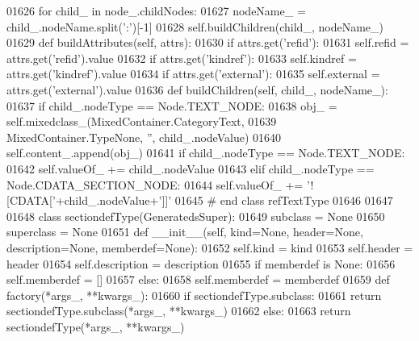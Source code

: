 \begin{DoxyCode}
{{{{{{{{{{{{{{{{{{{{{{{{{{{{{{{{{{{{{{{{{{{{{{{{{{{{{{{{{{{{{{{{{{{{{{{{{{{{{{{{{{{{{{{{{{{{{{{{{{{{{{{{{{{{01626         \textcolor{keywordflow}{for} child\_ \textcolor{keywordflow}{in} node\_.childNodes:
01627             nodeName\_ = child\_.nodeName.split(\textcolor{stringliteral}{':'})[-1]
01628             self.buildChildren(child\_, nodeName\_)
01629     \textcolor{keyword}{def }buildAttributes(self, attrs):
01630         \textcolor{keywordflow}{if} attrs.get(\textcolor{stringliteral}{'refid'}):
01631             self.refid = attrs.get(\textcolor{stringliteral}{'refid'}).value
01632         \textcolor{keywordflow}{if} attrs.get(\textcolor{stringliteral}{'kindref'}):
01633             self.kindref = attrs.get(\textcolor{stringliteral}{'kindref'}).value
01634         \textcolor{keywordflow}{if} attrs.get(\textcolor{stringliteral}{'external'}):
01635             self.external = attrs.get(\textcolor{stringliteral}{'external'}).value
01636     \textcolor{keyword}{def }buildChildren(self, child\_, nodeName\_):
01637         \textcolor{keywordflow}{if} child\_.nodeType == Node.TEXT\_NODE:
01638             obj\_ = self.mixedclass_(MixedContainer.CategoryText,
01639                 MixedContainer.TypeNone, \textcolor{stringliteral}{''}, child\_.nodeValue)
01640             self.content\_.append(obj\_)
01641         \textcolor{keywordflow}{if} child\_.nodeType == Node.TEXT\_NODE:
01642             self.valueOf_ += child\_.nodeValue
01643         \textcolor{keywordflow}{elif} child\_.nodeType == Node.CDATA\_SECTION\_NODE:
01644             self.valueOf_ += \textcolor{stringliteral}{'![CDATA['}+child\_.nodeValue+\textcolor{stringliteral}{']]'}
01645 \textcolor{comment}{# end class refTextType}
01646 
01647 
01648 \textcolor{keyword}{class }sectiondefType(GeneratedsSuper):
01649     subclass = \textcolor{keywordtype}{None}
01650     superclass = \textcolor{keywordtype}{None}
01651     \textcolor{keyword}{def }__init__(self, kind=None, header=None, description=None, memberdef=None):
01652         self.kind = kind
01653         self.header = header
01654         self.description = description
01655         \textcolor{keywordflow}{if} memberdef \textcolor{keywordflow}{is} \textcolor{keywordtype}{None}:
01656             self.memberdef = []
01657         \textcolor{keywordflow}{else}:
01658             self.memberdef = memberdef
01659     \textcolor{keyword}{def }factory(*args\_, **kwargs\_):
01660         \textcolor{keywordflow}{if} sectiondefType.subclass:
01661             \textcolor{keywordflow}{return} sectiondefType.subclass(*args\_, **kwargs\_)
01662         \textcolor{keywordflow}{else}:
01663             \textcolor{keywordflow}{return} sectiondefType(*args\_, **kwargs\_)
}}}}}}}}}}}}}}}}}}}}}}}}}}}}}}}}}}}}}}}}}}}}}}}}}}}}}}}}}}}}}}}}}}}}}}}}}}}}}}}}}}}}}}}}}}}}}}}}}}}}}}}}}}}}
\end{DoxyCode}
